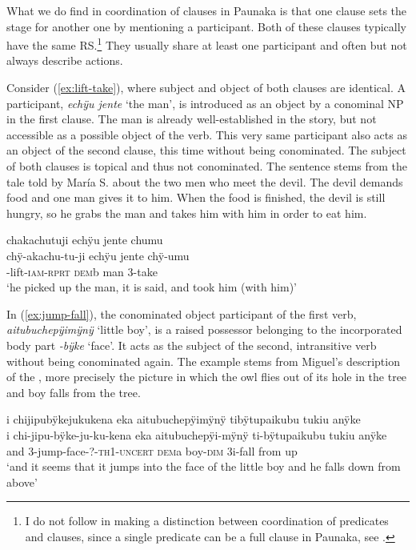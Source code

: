 What we do find in coordination of clauses in Paunaka is that one clause sets the stage for another one by mentioning a participant. Both of these clauses typically have the same RS.\footnote{I do not follow \citet[]{Mithun1988} in making a distinction between coordination of predicates and clauses, since a single predicate can be a full clause in Paunaka, see .} They usually share at least one participant and often but not always describe  actions.

Consider (\ref{ex:lift-take}), where subject and object of both clauses are identical. A participant, \textit{echÿu jente} ‘the man’, is introduced as an object by a conominal NP in the first clause. The man is already well-established in the story, but not accessible as a possible object of the verb. This very same participant also acts as an object of the second clause, this time without being conominated. The subject of both clauses is topical and thus not conominated. The sentence stems from the tale told by María S. about the two men who meet the devil. The devil demands food and one man gives it to him. When the food is finished, the devil is still hungry, so he grabs the man and takes him with him in order to eat him.

\ea\label{ex:lift-take}
\begingl
\glpreamble chakachutuji echÿu jente chumu\\
\gla chÿ-akachu-tu-ji echÿu jente chÿ-umu\\
-lift-\textsc{iam}-\textsc{rprt} \textsc{dem}b man 3-take\\
\glft ‘he picked up the man, it is said, and took him (with him)’
\endgl
\trailingcitation{[rxx-n120511l-2.57]}
\xe

In (\ref{ex:jump-fall}), the conominated object participant of the first verb, \textit{aitubuchepÿimÿnÿ} ‘little boy’, is a raised possessor belonging to the incorporated body part \textit{-bÿke} ‘face’. It acts as the subject of the second, intransitive verb without being conominated again. The example stems from Miguel’s description of the , more precisely the picture in which the owl flies out of its hole in the tree and boy falls from the tree.

\ea\label{ex:jump-fall}
\begingl
\glpreamble i chijipubÿkejukukena eka aitubuchepÿimÿnÿ tibÿtupaikubu tukiu anÿke\\
\gla i chi-jipu-bÿke-ju-ku-kena eka aitubuchepÿi-mÿnÿ ti-bÿtupaikubu tukiu anÿke\\
\glb and 3-jump-face-?-\textsc{th}1-\textsc{uncert} \textsc{dem}a boy-\textsc{dim} 3i-fall from up\\
\glft ‘and it seems that it jumps into the face of the little boy and he falls down from above’
\endgl
\trailingcitation{[mox-a110920l-2.102]}
\xe

